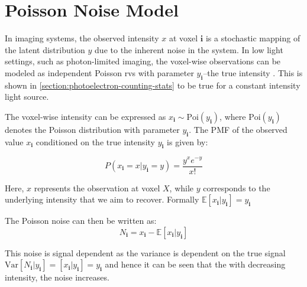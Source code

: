 \section{Poisson Noise Model}\label{sec:poisson-noise-model}
In imaging systems, the observed intensity $x$ at voxel $\mathbf{i}$ is a stochastic mapping of the latent distribution $y$ due to the inherent noise in the system. In low light settings, such as photon-limited imaging, the voxel-wise observations can be modeled as independent Poisson \glspl{rv} with parameter $y_{\mathbf{i}}$--the true intensity \cite{makitaloOptimalInversionAnscombe2011,kimDeepLearningbasedStatistical2021}. This is shown in \cref{section:photoelectron-counting-stats} to be true for a constant intensity light source.

The voxel-wise intensity can be expressed as $x_{\mathbf{i}} \sim \text{Poi}(y_{\mathbf{i}})$, where $\text{Poi}(y_{\mathbf{i}})$ denotes the Poisson distribution with parameter $y_{\mathbf{i}}$. The \gls{PMF} of the observed value $x_{\mathbf{i}}$ conditioned on the true intensity $y_{\mathbf{i}}$ is given by:

\begin{equation}
    P(x_{\mathbf{i}} = x| y_{\mathbf{i}} = y) = \frac{y^x e^{-y}}{x!}
\end{equation}

Here, $x$ represents the observation at voxel $X$, while $y$ corresponds to the underlying intensity that we aim to recover. Formally $\mathbb{E}[x_{\mathbf{i}} | y_{\mathbf{i}}] = y_{\mathbf{i}}$

The Poisson noise can then be written as:
\begin{equation}
    N_{\mathbf{i}} = x_{\mathbf{i}} - \mathbb{E}[x_{\mathbf{i}} | y_{\mathbf{i}}]
\end{equation}

This noise is signal dependent as the variance is dependent on the true signal $\text{Var}[N_{\mathbf{i}} | y_{\mathbf{i}}] = [x_{\mathbf{i}} | y_{\mathbf{i}}] = y_{\mathbf{i}}$ and hence it can be seen that the with decreasing intensity, the noise increases.

